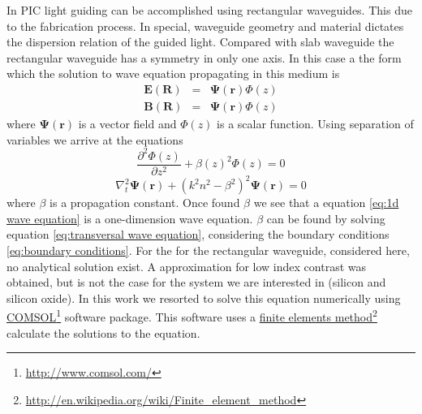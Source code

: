 \documentclass[12pt,twoside,english]{book}
\renewcommand{\~}{\perispomeni}%
\numberwithin{equation}{section}
\numberwithin{figure}{section}
\newcommand\fnurl[2]{%
 \href{#2}{#1}\footnote{\url{#2}}%
}
\begin{document}
In PIC light guiding can be accomplished using rectangular waveguides. This due to the fabrication process. In special, waveguide geometry and material dictates the dispersion relation of the guided light. Compared with slab waveguide the rectangular waveguide has a symmetry in only one axis. In this case a the form which the solution to wave equation propagating in this medium is
\begin{subequations}
\begin{eqnarray}
\mathbf{E}\left(\mathbf{R}\right) & = & \mathbf{\Psi}\left(\mathbf{r}\right)\Phi\left(z\right)\label{eq:assumption E waveguide}\\
\mathbf{B}\left(\mathbf{R}\right) & = & \mathbf{\Psi}\left(\mathbf{r}\right)\Phi\left(z\right)\label{eq:assumption B waveguide}
\end{eqnarray}
\end{subequations}
where $\mathbf{\Psi}\left(\mathbf{r}\right)$ is a vector field and $\Phi\left(z\right)$ is a scalar function. Using separation of variables we arrive at the equations
\begin{equation}
\frac{\partial^{2}\Phi\left(z\right)}{\partial z^{2}}+\beta\left(z\right)^{2}\Phi\left(z\right)=0
\label{eq:1d wave equation}
\end{equation}
\begin{equation}
\nabla_{t}^{2}\mathbf{\Psi}\left(\mathbf{r}\right)+\left(k^2 n^2 -\beta^2 \right)^{2}\mathbf{\Psi}\left(\mathbf{r}\right)=0
\label{eq:transversal wave equation}
\end{equation}
where $\beta$ is a propagation constant. Once found $\beta$ we see that a equation \ref{eq:1d wave equation} is a one-dimension wave equation. $\beta$ can be found by solving equation \ref{eq:transversal wave equation}, considering the boundary conditions \ref{eq:boundary conditions}. For the for the rectangular waveguide, considered here, no analytical solution exist. A approximation for low index contrast was obtained\cite{Marcatili:1969p2589}, but is not the case for the system we are interested in (silicon and silicon oxide). In this work we resorted to solve this equation numerically using \fnurl{COMSOL}{http://www.comsol.com/} software package. This software uses a \fnurl{finite elements method}{http://en.wikipedia.org/wiki/Finite_element_method} calculate the solutions to the equation.
\end{document}
